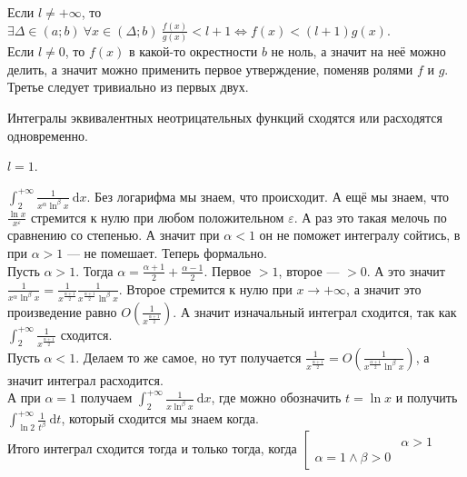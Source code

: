\documentclass{article}
\begin{document}
\begin{itemize}
        \begin{Proof}
            Если $l\neq+\infty$, то $\exists\Delta\in(a;b)~\forall x\in(\Delta;b)~\frac{f(x)}{g(x)}<l+1\Leftrightarrow f(x)<(l+1)g(x)$.\\
            Если $l\neq0$, то $f(x)$ в какой-то окрестности $b$ не ноль, а значит на неё можно делить, а значит можно применить первое утверждение, поменяв ролями $f$ и $g$.\\
            Третье следует тривиально из первых двух.
        \end{Proof}
        \thm Интегралы эквивалентных неотрицательных функций сходятся или расходятся одновременно.
        \begin{Proof}
            $l=1$.
        \end{Proof}
        \begin{Example}
            $\int_2^{+\infty}\frac1{x^\alpha\ln^\beta x}~\mathrm dx$. Без логарифма мы знаем, что происходит. А ещё мы знаем, что $\frac{\ln x}{x^\varepsilon}$ стремится к нулю при любом положительном $\varepsilon$. А раз это такая мелочь по сравнению со степенью. А значит при $\alpha<1$ он не поможет интегралу сойтись, в при $\alpha>1$ --- не помешает. Теперь формально.\\
            Пусть $\alpha>1$. Тогда $\alpha=\frac{\alpha+1}2+\frac{\alpha-1}2$. Первое $>1$, второе --- $>0$.  А это значит $\frac1{x^\alpha\ln^\beta x}=\frac1{x^{\frac{\alpha+1}2}}\frac1{x^{\frac{\alpha+1}2}\ln^\beta x}$. Второе стремится к нулю при $x\to+\infty$, а значит это произведение равно $O\left(\frac1{x^{\frac{\alpha+1}2}}\right)$. А значит изначальный интеграл сходится, так как $\int_2^{+\infty}\frac1{x^{\frac{\alpha+1}2}}$ сходится.\\
            Пусть $\alpha<1$. Делаем то же самое, но тут получается $\frac1{x^{\frac{\alpha+1}2}}=O\left(\frac1{x^{\frac{\alpha+1}2}\ln^\beta x}\right)$, а значит интеграл расходится.\\
            А при  $\alpha=1$ получаем $\int_2^{+\infty}\frac1{x\ln^\beta x}~\mathrm dx$, где можно обозначить $t=\ln x$ и получить $\int_{\ln 2}^{+\infty}\frac1{t^\beta}~\mathrm dt$, который сходится мы знаем когда.\\
            Итого интеграл сходится тогда и только тогда, когда $\left[\begin{aligned}
                &\alpha>1\\
                \alpha=1\land\beta>0
            \end{aligned}\right.$
        \end{Example}

\end{itemize}
\end{document}
